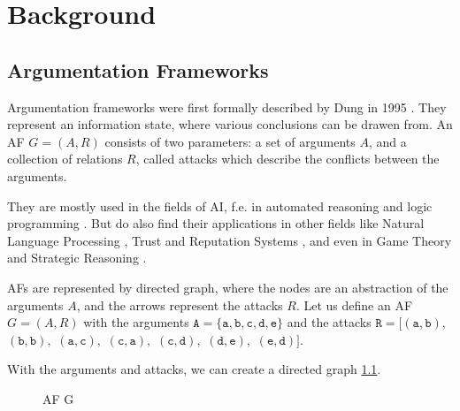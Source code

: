 \chapter{Background}

\section{Argumentation Frameworks}


Argumentation frameworks were first formally described by Dung in 1995 \cite{DUNG1995321}. They represent an information state, where various conclusions can be drawen from. An AF $G = (A, R)$ consists of two parameters: a set of arguments $A$, and a collection of relations $R$, called attacks which describe the conflicts between the arguments.

They are mostly used in the fields of \ac{AI}, f.e. in automated reasoning and logic programming \cite{AFINAIARLP, AFINAIARLPexample}. But do also find their applications in other fields like Natural Language Processing \cite{AFINNLP}, Trust and Reputation Systems \cite{AFINTaRS}, and even in Game Theory and Strategic Reasoning \cite{AFinGames}.

AFs are represented by directed graph, where the nodes are an abstraction of the arguments $A$, and the arrows represent the attacks $R$. Let us define an AF $G = (A, R)$ with the arguments
$\mathtt{A=\{a, b, c, d, e\}}$ and the attacks
$\mathtt{R=[(a,b),}$
$\mathtt{(b,b),}$
$\mathtt{(a,c),}$
$\mathtt{(c,a),}$
$\mathtt{(c,d),}$
$\mathtt{(d,e),}$
$\mathtt{(e,d)]}.$

With the arguments and attacks, we can create a directed graph \ref{af:backgroundAFexample1}.
\begin{figure}[h]
    \centering
    \caption{\ac{AF} G}
    \label{af:backgroundAFexample1}
\end{figure}

